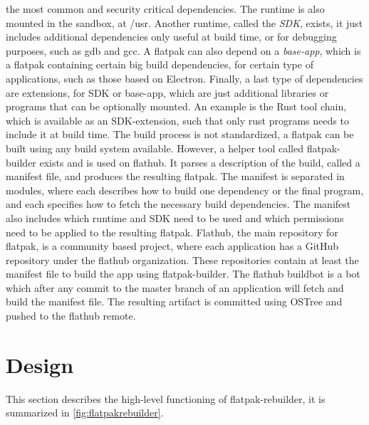 \documentclass[a4paper,11pt,oneside]{report}
\theoremstyle{definition}
\newcommand{\sysname}{flatpak-rebuilder\xspace}
\newcommand{\fp}{flatpak\xspace}
\newcommand{\fh}{flathub\xspace}
\newcommand{\fb}{flatpak-builder\xspace}
\newcommand{\fhbb}{flathub buildbot\xspace}
\newcommand{\ot}{OSTree\xspace}
\begin{document}
the most common and security critical dependencies. The runtime is also mounted
in the sandbox, at /usr. Another runtime, called the \emph{SDK},
exists, it just includes additional dependencies only useful at build time, or
for debugging purposes, such as gdb and gcc. A \fp can also depend on a
\emph{base-app}, which is a \fp containing certain big build dependencies, for
certain type of applications, such as those based on Electron. Finally, a last
type of dependencies are extensions, for SDK or base-app, which are just
additional libraries or programs that can be optionally mounted. An example is
the Rust tool chain, which is available as an SDK-extension, such that only
rust programs needs to include it at build time. The build process is not
standardized, a \fp can be built using any build system available. However, a
helper tool called \fb exists and is used on \fh. It parses a description of
the build, called a manifest file, and produces the resulting \fp. The manifest
is separated in modules, where each describes how to build one dependency or
the final program, and each specifies how to fetch the necessary build
dependencies. The manifest also includes which runtime and SDK need to be used
and which permissions need to be applied to the resulting \fp. Flathub, the
main repository for \fp, is a community based project, where each application
has a GitHub repository under the \fh organization. These repositories contain
at least the manifest file to build the app using \fb. The \fhbb is a bot which
after any commit to the master branch of an application will fetch and build
the manifest file. The resulting artifact is committed using \ot and pushed to
the \fh remote.


\chapter{Design}
\label{chap:design}

This section describes the high-level functioning of \sysname, it is summarized
in \autoref{fig:flatpakrebuilder}.
\end{document}
